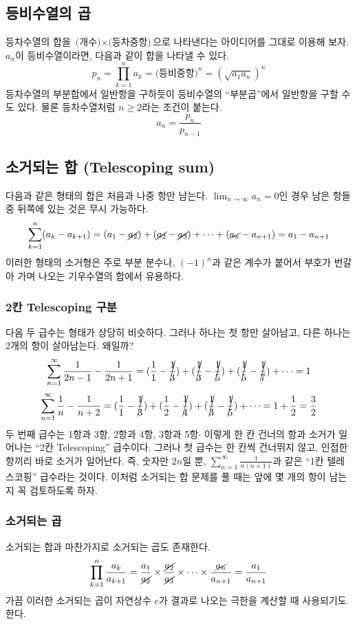 \documentclass{scrartcl}
\newcommand{\Lim}[1]{\lim_{#1\to\infty}}
\newcommand{\infsum}[1]{\sum^\infty_{#1}}
\begin{document}
\subsection{등비수열의 곱}
등차수열의 합을 \(\text{(개수)}\times\text{(등차중항)}\)으로 나타낸다는 아이디어를 그대로 이용해 보자. \(a_n\)이 등비수열이라면, 다음과 같이 합을 나타낼 수 있다.
\[
p_n=\prod^n_{k=1}a_k=\text{(등비중항)}^n=\left(\sqrt{a_1a_n}\right)^n
\]
등차수열의 부분합에서 일반항을 구하듯이 등비수열의 ``부분곱''에서 일반항을 구할 수도 있다. 물론 등차수열처럼 \(n\geq2\)라는 조건이 붙는다.
\[
a_n=\frac{p_n}{p_{n-1}}
\]

\subsection{소거되는 합 (Telescoping sum)}
다음과 같은 형태의 합은 처음과 나중 항만 남는다. \(\Lim{n} a_n=0\)인 경우 남은 항들 중 뒤쪽에 있는 것은 무시 가능하다.
\[
\sum^n_{k=1}(a_k-a_{k+1})=(a_1-\cancel{a_2})+(\cancel{a_2}-\cancel{a_3})+\cdots+(\cancel{a_n}-a_{n+1})=a_1-a_{n+1}
\]
이러한 형태의 소거형은 주로 부분 분수나, \((-1)^n\)과 같은 계수가 붙어서 부호가 번갈아 가며 나오는 기우수열의 합에서 유용하다.
\subsubsection{2칸 Telescoping 구분}
다음 두 급수는 형태가 상당히 비슷하다. 그러나 하나는 첫 항만 살아남고, 다른 하나는 2개의 항이 살아남는다. 왜일까?
\[
\infsum{n=1}\frac{1}{2n-1}-\frac{1}{2n+1} = (\frac{1}{1}-\cancel{\frac{1}{3}})+(\cancel{\frac{1}{3}}-\cancel{\frac{1}{5}})+(\cancel{\frac{1}{5}}-\cancel{\frac{1}{7}})+\cdots = 1
\]
\[
\infsum{n=1}\frac{1}{n}-\frac{1}{n+2} = (\frac{1}{1}-\cancel{\frac{1}{3}})+({\frac{1}{2}}-\cancel{\frac{1}{4}})+(\cancel{\frac{1}{3}}-\cancel{\frac{1}{5}})+\cdots = 1+\frac{1}{2} = \frac{3}{2}
\]
두 번째 급수는 1항과 3항, 2항과 4항, 3항과 5항\(\cdot\) 이렇게 한 칸 건너의 항과 소거가 일어나는 ``2칸 Telescoping'' 급수이다. 그러나 첫 급수는 한 칸씩 건너뛰지 않고, 인접한 항끼리 바로 소거가 일어난다. 즉, 숫자만 \(2n\)일 뿐, \(\infsum{n=1}\frac{1}{n(n+1)}\)과 같은 ``1칸 텔레스코핑'' 급수라는 것이다. 이처럼 소거되는 합 문제를 풀 때는 앞에 몇 개의 항이 남는지 꼭 검토하도록 하자.

\subsubsection{소거되는 곱}
소거되는 합과 마찬가지로 소거되는 곱도 존재한다.
\[
\prod^n_{k=1}\frac{a_k}{a_{k+1}}=\frac{a_1}{\cancel{a_2}}\times\frac{\cancel{a_2}}{\cancel{a_3}}\times\cdots\times\frac{\cancel{a_n}}{a_{n+1}}=\frac{a_1}{a_{n+1}}
\]
가끔 이러한 소거되는 곱이 자연상수 \(e\)가 결과로 나오는 극한을 계산할 때 사용되기도 한다.
\end{document}
